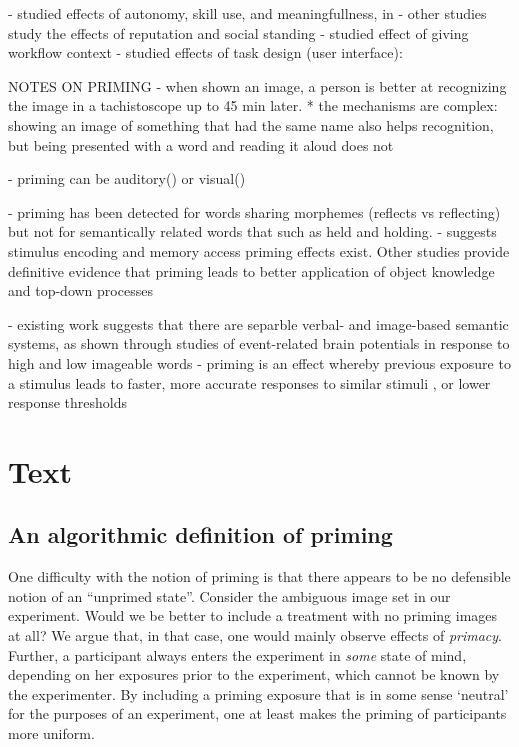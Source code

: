\documentclass[a4paper]{report}
\begin{document}
- studied effects of autonomy, skill use, and meaningfullness, in 
- other studies study the effects of reputation and social standing
- studied effect of giving workflow context\cite{Kinnaird2012281}
- studied effects of task design (user interface): \cite{Finnerty2013}

NOTES ON PRIMING
- when shown an image, a person is better at recognizing the image in a 
	tachistoscope up to 45 min later.\cite{BJOP:BJOP1796}
	* the mechanisms are complex: showing an image of something that had the
		same name also helps recognition, but being presented with a word and
		reading it aloud does not


- priming can be auditory(\cite{BJOP:BJOP1826}) or visual(\cite{BJOP:BJOP1796})

- priming has been detected for words sharing morphemes 
	(reflects vs reflecting) but not for semantically related words that such 
	as held and holding.\cite{BJOP:BJOP1826}
	- suggests stimulus encoding \cite{beller1971priming}\cite{BJOP:BJOP1826}
	\cite{BJOP:BJOP1796} and memory access \cite{beller1971priming} priming 
	effects exist.  Other studies provide definitive evidence that priming
	leads to better application of object knowledge and top-down processes
	\cite{Ghuman17062008}

- existing work suggests that there are separble verbal- and image-based
	semantic systems, as shown through studies of event-related brain 
	potentials in response to high and low imageable words \cite{Swaab200299} 
- priming is an effect whereby previous exposure to a stimulus leads to 
	faster, more accurate responses to similar stimuli \cite{Ghuman17062008}, 
	or lower response thresholds \cite{BJOP:BJOP1826}
	

\section*{Text}
\subsection*{An algorithmic definition of priming}
One difficulty with the notion of priming is that there appears to be no 
defensible notion of an ``unprimed state''.  Consider the ambiguous image set 
in our experiment.  Would we be better to include a treatment with no
priming images at all?  We argue that, in that case, one would mainly observe  
effects of \textit{primacy}.  
Further, a participant always enters the experiment in \textit{some} state of 
mind, depending on her exposures prior to the experiment, which cannot be 
known by the experimenter.  By including a priming exposure that is in some 
sense `neutral' for the purposes of an experiment, one at least makes the 
priming of participants more uniform.  
\end{document}

